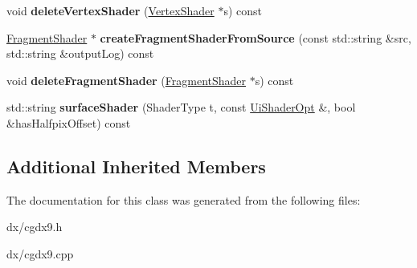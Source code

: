 \begin{DoxyCompactItemize}
\item 
\hypertarget{class_tempest_1_1_cg_dx9_a253f193625fc35929d56477d36fdbfa4}{void {\bfseries delete\+Vertex\+Shader} (\hyperlink{class_tempest_1_1_vertex_shader}{Vertex\+Shader} $\ast$s) const }\label{class_tempest_1_1_cg_dx9_a253f193625fc35929d56477d36fdbfa4}

\item 
\hypertarget{class_tempest_1_1_cg_dx9_acb12670c11cbc823d74549a0caf8e229}{\hyperlink{class_tempest_1_1_fragment_shader}{Fragment\+Shader} $\ast$ {\bfseries create\+Fragment\+Shader\+From\+Source} (const std\+::string \&src, std\+::string \&output\+Log) const }\label{class_tempest_1_1_cg_dx9_acb12670c11cbc823d74549a0caf8e229}

\item 
\hypertarget{class_tempest_1_1_cg_dx9_a0ec6f19e3daa42041781c2b32f4f6f1c}{void {\bfseries delete\+Fragment\+Shader} (\hyperlink{class_tempest_1_1_fragment_shader}{Fragment\+Shader} $\ast$s) const }\label{class_tempest_1_1_cg_dx9_a0ec6f19e3daa42041781c2b32f4f6f1c}

\item 
\hypertarget{class_tempest_1_1_cg_dx9_a7d3eceb512c46c9cc1044e55ba29f0dc}{std\+::string {\bfseries surface\+Shader} (Shader\+Type t, const \hyperlink{struct_tempest_1_1_abstract_shading_lang_1_1_ui_shader_opt}{Ui\+Shader\+Opt} \&, bool \&has\+Halfpix\+Offset) const }\label{class_tempest_1_1_cg_dx9_a7d3eceb512c46c9cc1044e55ba29f0dc}

\end{DoxyCompactItemize}
\subsection*{Additional Inherited Members}


The documentation for this class was generated from the following files\+:\begin{DoxyCompactItemize}
\item 
dx/cgdx9.\+h\item 
dx/cgdx9.\+cpp\end{DoxyCompactItemize}
